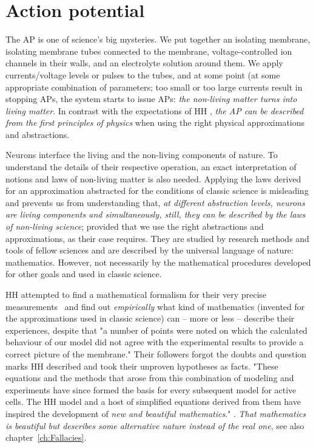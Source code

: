 
\section{Action potential\label{sec:Physiology-DerivingActionPotential}}


The \gls{AP}
is one of science's big mysteries. We put together an isolating membrane,
isolating membrane tubes connected to the membrane, voltage-controlled ion channels
in their walls, and an electrolyte solution around them.
We apply currents/voltage levels or pulses to the tubes,
and at some point (at some appropriate combination of parameters; too small or too large currents result in stopping 
APs, the system starts to issue
APs:
 \hypertarget{LivingMatter}{\textit{the non-living matter turns into living matter}}. In contrast with the expectations of
 HH \cite{HodgkinHuxley:1952},
\textit{the 
AP can be described from the first principles of physics} when using the right physical
{approximations and abstractions}.

Neurons interface the living and the non-living components of nature. To understand
the details of their respective operation, an exact  interpretation of notions and laws
of non-living matter is also needed. Applying the laws derived for an approximation
abstracted for the conditions of classic science is misleading and prevents us from understanding
that, \textit{at different abstraction levels, neurons are living components and simultaneously,
still, they can be described by the laws of non-living science}; provided
that we use the right abstractions and approximations, as their case requires.
They are studied by research methods and tools
of fellow sciences and are described by the universal language of nature: mathematics.
However, not necessarily by the mathematical procedures developed for other goals
and used in classic science.

\gls{HH}  attempted to find a mathematical formalism
for their very precise measurements~\cite{HodgkinHuxley:1952} and find out \textit{empirically} what kind of mathematics (invented for the approximations used in classic science) can -- more or less -- describe 
their experiences,
despite that "a number of points were noted on which the calculated behaviour of our model did not agree with the experimental results to provide a correct picture of the
membrane." 
Their followers forgot the doubts and question marks HH described and took their unproven hypotheses as facts.
"These equations and the methods that arose from this combination of modeling and
experiments have since formed the basis for every subsequent model for active cells.
The %
HH model and a host of simplified equations  derived from
them have inspired the development of \textit{new and beautiful mathematics}." \cite{MathNeuroscience:2010}.
\textit{That mathematics is beautiful but describes 
some alternative nature instead of the real one}, see also chapter~\ref{ch:Fallacies}.


